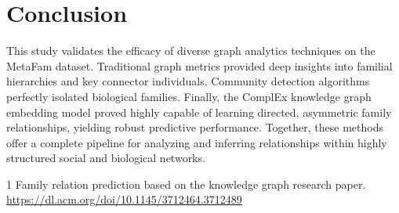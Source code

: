 \documentclass[10pt,twocolumn,letterpaper]{article}
\begin{document}
\section{Conclusion}
This study validates the efficacy of diverse graph analytics techniques on the MetaFam dataset. Traditional graph metrics provided deep insights into familial hierarchies and key connector individuals. Community detection algorithms perfectly isolated biological families. Finally, the ComplEx knowledge graph embedding model proved highly capable of learning directed, asymmetric family relationships, yielding robust predictive performance. Together, these methods offer a complete pipeline for analyzing and inferring relationships within highly structured social and biological networks.


\begin{thebibliography}{1}
Family relation prediction based on the knowledge graph research paper. \url{https://dl.acm.org/doi/10.1145/3712464.3712489}
\end{thebibliography}
\end{document}

